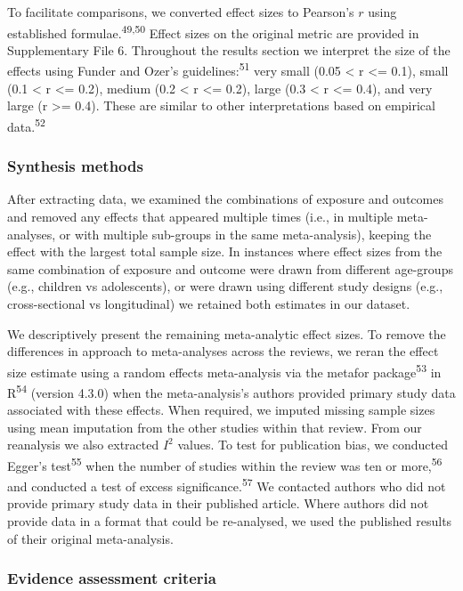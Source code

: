 \documentclass[
  english,
  man]{apa6}
\begin{document}
To facilitate comparisons, we converted effect sizes to Pearson's \(r\) using established formulae.\textsuperscript{49,50}
Effect sizes on the original metric are provided in Supplementary File 6.
Throughout the results section we interpret the size of the effects using Funder and Ozer's guidelines:\textsuperscript{51} very small (0.05 \textless{} r \textless= 0.1), small (0.1 \textless{} r \textless= 0.2), medium (0.2 \textless{} r \textless= 0.2), large (0.3 \textless{} r \textless= 0.4), and very large (r \textgreater= 0.4).
These are similar to other interpretations based on empirical data.\textsuperscript{52}

\hypertarget{synthesis-methods}{%
\subsubsection{Synthesis methods}\label{synthesis-methods}}

After extracting data, we examined the combinations of exposure and outcomes and removed any effects that appeared multiple times (i.e., in multiple meta-analyses, or with multiple sub-groups in the same meta-analysis), keeping the effect with the largest total sample size.
In instances where effect sizes from the same combination of exposure and outcome were drawn from different age-groups (e.g., children vs adolescents), or were drawn using different study designs (e.g., cross-sectional vs longitudinal) we retained both estimates in our dataset.

We descriptively present the remaining meta-analytic effect sizes.
To remove the differences in approach to meta-analyses across the reviews, we reran the effect size estimate using a random effects meta-analysis via the metafor package\textsuperscript{53} in R\textsuperscript{54} (version 4.3.0) when the meta-analysis's authors provided primary study data associated with these effects.
When required, we imputed missing sample sizes using mean imputation from the other studies within that review.
From our reanalysis we also extracted \(I^2\) values.
To test for publication bias, we conducted Egger's test\textsuperscript{55} when the number of studies within the review was ten or more,\textsuperscript{56} and conducted a test of excess significance.\textsuperscript{57}
We contacted authors who did not provide primary study data in their published article.
Where authors did not provide data in a format that could be re-analysed, we used the published results of their original meta-analysis.

\hypertarget{evidence-assessment-criteria}{%
\subsubsection{Evidence assessment criteria}\label{evidence-assessment-criteria}}
\end{document}
